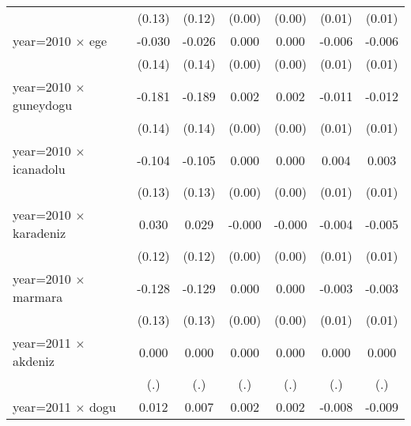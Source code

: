 {\begin{tabular}{l*{6}{c}}
                    &      (0.13)         &      (0.12)         &      (0.00)         &      (0.00)         &      (0.01)         &      (0.01)         \\
year=2010 $\times$ ege&      -0.030         &      -0.026         &       0.000         &       0.000         &      -0.006         &      -0.006         \\
                    &      (0.14)         &      (0.14)         &      (0.00)         &      (0.00)         &      (0.01)         &      (0.01)         \\
year=2010 $\times$ guneydogu&      -0.181         &      -0.189         &       0.002         &       0.002         &      -0.011         &      -0.012         \\
                    &      (0.14)         &      (0.14)         &      (0.00)         &      (0.00)         &      (0.01)         &      (0.01)         \\
year=2010 $\times$ icanadolu&      -0.104         &      -0.105         &       0.000         &       0.000         &       0.004         &       0.003         \\
                    &      (0.13)         &      (0.13)         &      (0.00)         &      (0.00)         &      (0.01)         &      (0.01)         \\
year=2010 $\times$ karadeniz&       0.030         &       0.029         &      -0.000         &      -0.000         &      -0.004         &      -0.005         \\
                    &      (0.12)         &      (0.12)         &      (0.00)         &      (0.00)         &      (0.01)         &      (0.01)         \\
year=2010 $\times$ marmara&      -0.128         &      -0.129         &       0.000         &       0.000         &      -0.003         &      -0.003         \\
                    &      (0.13)         &      (0.13)         &      (0.00)         &      (0.00)         &      (0.01)         &      (0.01)         \\
year=2011 $\times$ akdeniz&       0.000         &       0.000         &       0.000         &       0.000         &       0.000         &       0.000         \\
                    &         (.)         &         (.)         &         (.)         &         (.)         &         (.)         &         (.)         \\
year=2011 $\times$ dogu&       0.012         &       0.007         &       0.002         &       0.002         &      -0.008         &      -0.009         \\

\end{tabular}}

